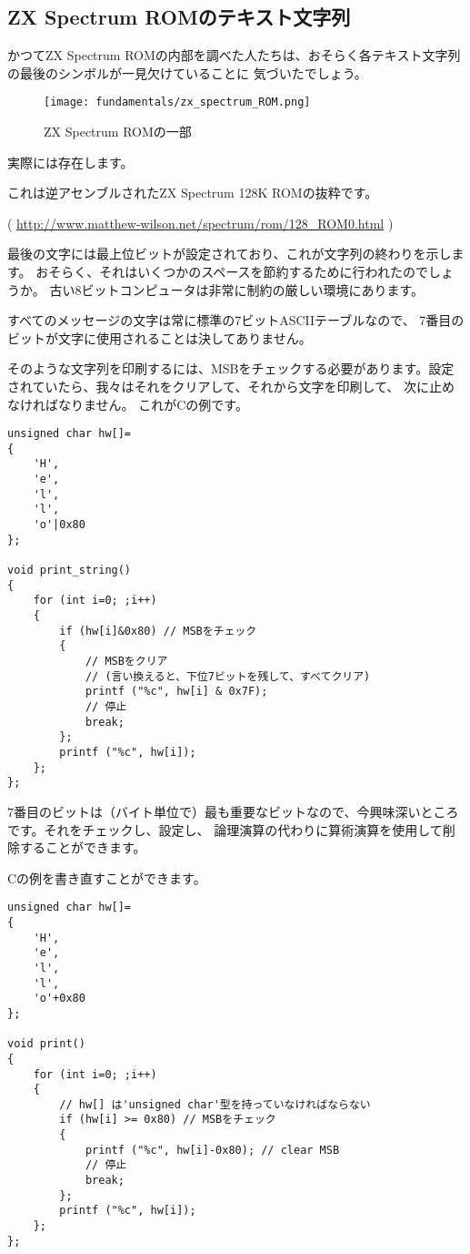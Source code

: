 ﻿
\label{AND_OR_as_SUB_ADD}

\subsection{ZX Spectrum ROMのテキスト文字列}

かつてZX Spectrum \ac{ROM}の内部を調べた人たちは、おそらく各テキスト文字列の最後のシンボルが一見欠けていることに
気づいたでしょう。

\begin{figure}[H]
\centering
\texttt{[image: fundamentals/zx\_spectrum\_ROM.png]}
\caption{ZX Spectrum ROMの一部}
\end{figure}

実際には存在します。

これは逆アセンブルされたZX Spectrum 128K ROMの抜粋です。


( \url{http://www.matthew-wilson.net/spectrum/rom/128_ROM0.html} )

最後の文字には最上位ビットが設定されており、これが文字列の終わりを示します。
おそらく、それはいくつかのスペースを節約するために行われたのでしょうか。
古い8ビットコンピュータは非常に制約の厳しい環境にあります。

すべてのメッセージの文字は常に標準の7ビット\ac{ASCII}テーブルなので、
7番目のビットが文字に使用されることは決してありません。

そのような文字列を印刷するには、\ac{MSB}をチェックする必要があります。設定されていたら、我々はそれをクリアして、それから文字を印刷して、
次に止めなければなりません。
これがCの例です。

\begin{lstlisting}[style=customc]
unsigned char hw[]=
{
	'H',
	'e',
	'l',
	'l',
	'o'|0x80
};

void print_string()
{
	for (int i=0; ;i++)
	{
		if (hw[i]&0x80) // MSBをチェック
		{
			// MSBをクリア
			// (言い換えると、下位7ビットを残して、すべてクリア)
			printf ("%c", hw[i] & 0x7F);
			// 停止
			break;
		};
		printf ("%c", hw[i]);
	};
};
\end{lstlisting}

7番目のビットは（バイト単位で）最も重要なビットなので、今興味深いところです。それをチェックし、設定し、
論理演算の代わりに算術演算を使用して削除することができます。

Cの例を書き直すことができます。

\begin{lstlisting}[style=customc]
unsigned char hw[]=
{
	'H',
	'e',
	'l',
	'l',
	'o'+0x80
};

void print()
{
	for (int i=0; ;i++)
	{
		// hw[] は'unsigned char'型を持っていなければならない
		if (hw[i] >= 0x80) // MSBをチェック
		{
			printf ("%c", hw[i]-0x80); // clear MSB
			// 停止
			break;
		};
		printf ("%c", hw[i]);
	};
};
\end{lstlisting}

